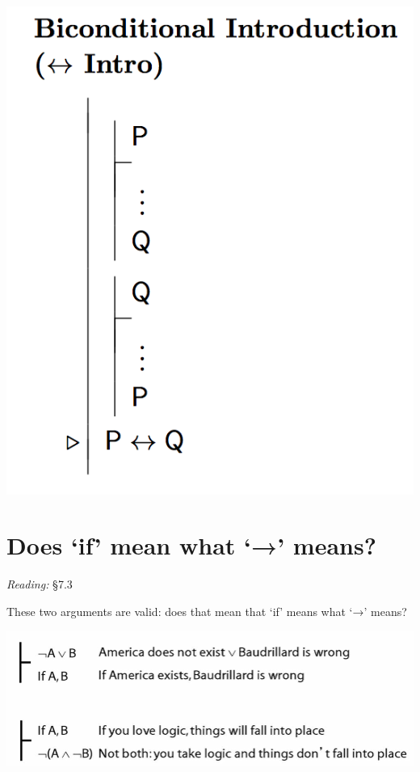 \documentclass[12pt]{extarticle}
\begin{document}
\begin{multicols*}{3}
\begin{center}
\includegraphics[scale=0.3]{img/rule_biconditional_intro.png}
\end{center}
 
\columnbreak
\section{Does ‘if’ mean what ‘→’ means?}
 
\emph{Reading:} §7.3
 
\begin{minipage}{\columnwidth}
 
These two arguments are valid: does that mean that `if' means what `→' means?
 
\begin{center}
\includegraphics[scale=0.3]{img/if_is_arrow.png}
\end{center}
\end{minipage}
 

\end{multicols*}
\end{document}
